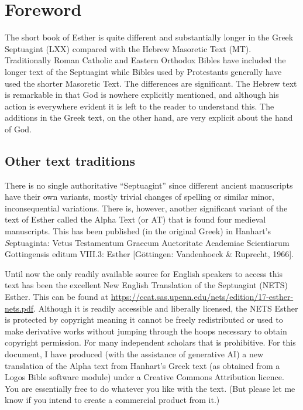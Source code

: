 \clearpage
{
  \fontsize{11}{13.5}\selectfont
  \setlength{\parindent}{1.5em}
\section*{Foreword}

The short book of Esther is quite different and substantially longer in the Greek Septuagint (LXX) compared with the Hebrew Masoretic Text (MT). Traditionally Roman Catholic and Eastern Orthodox Bibles have included the longer text of the Septuagint while Bibles used by Protestants generally have used the shorter Masoretic Text. The differences are significant. The Hebrew text is remarkable in that God is nowhere explicitly mentioned, and although his action is everywhere evident it is left to the reader to understand this. The additions in the Greek text, on the other hand, are very explicit about the hand of God.

\subsection*{Other text traditions}
There is no single authoritative ``Septuagint'' since different ancient manuscripts have their own variants, mostly trivial changes of spelling or similar minor, inconsequential variations. There is, however, another significant variant of the text of Esther called the Alpha Text (or AT) that is found four medieval manuscripts. This has been published (in the original Greek) in Hanhart's {\textit Septuaginta:
Vetus Testamentum Graecum Auctoritate Academiae Scientiarum Gottingensis editum VIII.3: Esther} [Göttingen:
Vandenhoeck \& Ruprecht, 1966].

Until now the only readily available source for English speakers to access this text has been the excellent New English Translation of the Septuagint (NETS) Esther. This can be found at \url{https://ccat.sas.upenn.edu/nets/edition/17-esther-nets.pdf}. Although it is readily accessible and liberally licensed, the NETS Esther is protected by copyright meaning it cannot be freely redistributed or used to make derivative works without jumping through the hoops necessary to obtain copyright permission. For many independent scholars that is prohibitive. For this document, I have produced (with the assistance of generative AI) a new translation of the Alpha text from Hanhart's Greek text (as obtained from a Logos Bible software module) under a Creative Commons Attribution licence. You are essentially free to do whatever you like with the text. (But please let me know if you intend to create a commercial product from it.)

}
